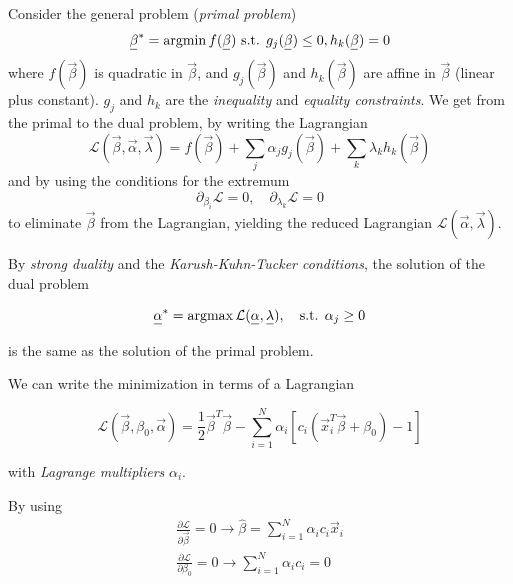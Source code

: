 Consider the general problem (\textit{primal problem})
\begin{equation}
    \vec{\beta}^* = \argmin f(\vec{\beta}) \text{ s.t. } g_j(\vec{\beta}) \leq 0, h_k(\vec{\beta}) = 0
\end{equation}
where $f(\vec{\beta})$ is quadratic in $\vec{\beta}$, and $g_j(\vec{\beta})$ and $h_k(\vec{\beta})$ are affine in $\vec{\beta}$ (linear plus constant).
$g_j$ and $h_k$ are the \textit{inequality} and \textit{equality constraints}.
We get from the primal to the dual problem, by writing the Lagrangian
\begin{equation}
    \mathcal{L}(\vec{\beta}, \vec{\alpha}, \vec{\lambda}) = f(\vec{\beta}) + \sum_j \alpha_j g_j(\vec{\beta}) + \sum_k \lambda_k h_k(\vec{\beta})
\end{equation}
and by using the conditions for the extremum
\begin{equation}
    \partial_{\beta_i} \mathcal{L} = 0, \quad \partial_{\lambda_k} \mathcal{L} = 0
\end{equation}
to eliminate $\vec{\beta}$ from the Lagrangian, yielding the 
reduced Lagrangian $\mathcal{L}( \vec{\alpha}, \vec{\lambda})$.

By \textit{strong duality} and the \textit{Karush-Kuhn-Tucker conditions}, the solution of the dual problem

\begin{equation}
    \vec{\alpha}^* = \argmax \mathcal{L}(\vec{\alpha}, \vec{\lambda}), \quad \text{s.t. } \alpha_j \geq 0
\end{equation}

is the same as the solution of the primal problem.


We can write the minimization in terms of a Lagrangian

\begin{equation}
    \mathcal{L}(\vec{\beta}, \beta_0, \vec{\alpha}) = \frac{1}{2} \vec{\beta}^T \vec{\beta} - \sum_{i=1}^N \alpha_i \left[ c_i \left( \vec{x}_i^T \vec{\beta} + \beta_0 \right) - 1 \right]
\end{equation}

with \textit{Lagrange multipliers} $\alpha_i$.

By using
\begin{equation}
    \begin{gathered}
    \frac{\partial \mathcal{L}}{\partial \vec{\beta}}=0 \rightarrow \hat{\beta}=\sum_{i=1}^N \alpha_i c_i \vec{x}_i \\
    \frac{\partial \mathcal{L}}{\partial \beta_0}=0 \rightarrow \sum_{i=1}^N \alpha_i c_i=0
    \end{gathered}
\end{equation}

